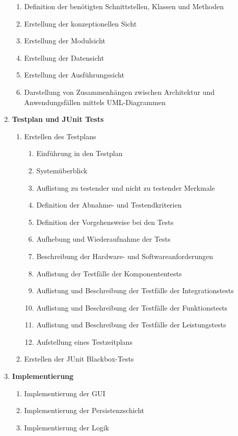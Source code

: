 \documentclass[fontsize=12pt,paper=a4,twoside]{scrartcl}
\begin{document}
\begin{enumerate}
\begin{enumerate}[label={(\arabic*)}]
	\item Definition der benötigten Schnittstellen, Klassen und Methoden
	\item Erstellung der konzeptionellen Sicht
	\item Erstellung der Modulsicht
	\item Erstellung der Datensicht
	\item Erstellung der Ausführungssicht
	\item Darstellung von Zusammenhängen zwischen Architektur und Anwendungsfällen mittels UML-Diagrammen
	\end{enumerate}
\item \textbf{Testplan und JUnit Tests}
		\begin{enumerate}[label={(\arabic*)}]
		\item Erstellen des Testplans
			\begin{enumerate}[label={(\arabic*)}]
			\item Einführung in den Testplan
			\item Systemüberblick
			\item Auflistung zu testender und nicht zu testender Merkmale
			\item Definition der Abnahme- und Testendkriterien
			\item Definition der Vorgehensweise bei den Tests
			\item Aufhebung und Wiederaufnahme der Tests
			\item Beschreibung der Hardware- und Softwareanforderungen
			\item Auflistung der Testfälle der Komponententests
			\item Auflistung und Beschreibung der Testfälle der Integrationstests
			\item Auflistung und Beschreibung der Testfälle der Funktionstests
			\item Auflistung und Beschreibung der Testfälle der Leistungstests
			\item Aufstellung eines Testzeitplans
			\end{enumerate}
		\item Erstellen der JUnit Blackbox-Tests
		\end{enumerate}
\item \textbf{Implementierung}
		\begin{enumerate}[label={(\arabic*)}]
		\item Implementierung der GUI
		\item Implementierung der Persistenzschicht
		\item Implementierung der Logik
		\end{enumerate}	
\end{enumerate}
\end{document}
